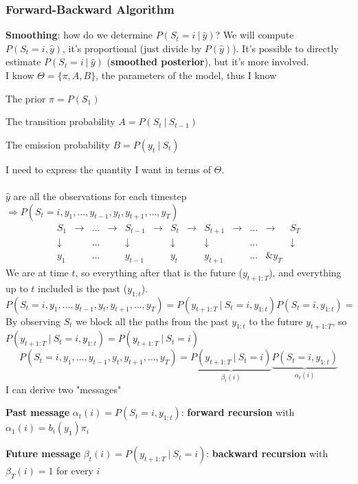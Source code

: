 \documentclass[10pt]{report}
\begin{document}
\subsubsection{Forward-Backward Algorithm} \textbf{Smoothing}: how do we determine $P(S_t = i\:|\:\hat{y})$? We will compute $P(S_t=i, \hat{y})$, it's proportional (just divide by $P(\hat{y})$). It's possible to directly estimate $P(S_t = i\:|\:\hat{y})$ (\textbf{smoothed posterior}), but it's more involved.\\
I know $\Theta=\{\pi,A,B\}$, the parameters of the model, thus I know 
\begin{list}{}{}
	\item The prior $\pi = P(S_1)$
	\item The transition probability $A = P(S_t\:|\:S_{t-1})$
	\item The emission probability $B = P(y_t\:|\:S_t)$
\end{list}
I need to express the quantity I want in terms of $\Theta$.\\\\
$\hat{y}$ are all the observations for each timestep $\Rightarrow P(S_t=i,y_1,\ldots,y_{t-1},y_t,y_{t+1},\ldots,y_T)$
$$\begin{array}{ccccccccccccc}
S_1&\rightarrow&\ldots&\rightarrow&S_{t-1}&\rightarrow&S_t&\rightarrow&S_{t+1}&\rightarrow&\ldots&\rightarrow&S_T\\
\downarrow& &\ldots& &\downarrow& &\downarrow& &\downarrow& &\ldots& &\downarrow\\
y_1&&\ldots&&y_{t-1}&&y_t&&y_{t+1}&&\ldots&\&y_T
\end{array}$$
We are at time $t$, so everything after that is the future ($y_{t+1:T}$), and everything up to $t$ included is the past ($y_{1:t}$).
$$P(S_t=i,y_1,\ldots,y_{t-1},y_t,y_{t+1},\ldots,y_T) = P(y_{t+1:T}\:|\:S_t=i, y_{1:t}) P(S_t=i,y_{1:t})=$$
By observing $S_t$ we block all the paths from the past $y_{1:t}$ to the future $y_{t+1:T}$, so $P(y_{t+1:T}\:|\:S_t=i, y_{1:t}) = P(y_{t+1:T}\:|\:S_t=i)$
$$P(S_t=i,y_1,\ldots,y_{t-1},y_t,y_{t+1},\ldots,y_T) = \underset{\beta_t(i)}{\underbrace{P(y_{t+1:T}\:|\:S_t=i)}} \underset{\alpha_t(i)}{\underbrace{P(S_t=i,y_{1:t})}}$$
I can derive two "messages"
\begin{list}{}{}
	\item \textbf{Past message} $\alpha_t(i) = P(S_t=i,y_{1:t})$: \textbf{forward recursion} with $\alpha_1(i)=b_i(y_1)\pi_i$
	\item \textbf{Future message} $\beta_t(i) = P(y_{t+1:T}\:|\:S_t=i)$: \textbf{backward recursion} with $\beta_T(i) = 1$ for every $i$
\end{list}
\end{document}
